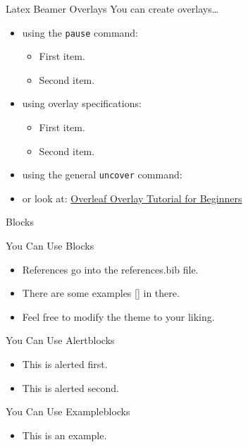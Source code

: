 \documentclass[aspectratio=1610]{beamer}
\begin{document}
\begin{frame}{Latex Beamer Overlays}
  You can create overlays\dots
  \begin{itemize}
    \item using the \texttt{pause} command:
    \begin{itemize}
      \item First item.
      \pause
      \item Second item.
    \end{itemize}
    \item using overlay specifications:
    \begin{itemize}
      \item<3-> First item.
      \item<4-> Second item.
    \end{itemize}
    \item using the general \texttt{uncover} command:
    \begin{itemize}
    \end{itemize}
    \item<7-> or look at: \href{https://www.overleaf.com/learn/latex/Beamer_Presentations\%3A_A_Tutorial_for_Beginners_(Part_4)\%E2\%80\%94Overlay_Specifications}{Overleaf Overlay Tutorial for Beginners}
  \end{itemize}
\end{frame}


\begin{frame}{Blocks}
  \begin{block}{You Can Use Blocks}
    \begin{itemize}
      \item References go into the references.bib file.
      \item There are some examples [\cite{biblatex,einstein}] in there.
      \item Feel free to modify the theme to your liking.
    \end{itemize}
  \end{block}
  \begin{alertblock}{You Can Use Alertblocks}
    \begin{itemize}
      \item<alert@1> This is alerted first.
      \item<alert@2> This is alerted second.
    \end{itemize}
  \end{alertblock}
  \begin{exampleblock}{You Can Use Exampleblocks}
    \begin{itemize}
      \item This is an example.
    \end{itemize}
  \end{exampleblock}
\end{frame}
\end{document}
